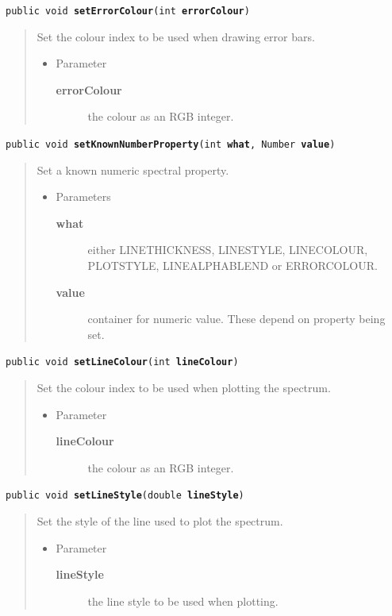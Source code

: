 \documentclass[twoside,11pt]{article}
\renewcommand{\_}{\texttt{\symbol{95}}}
\newcommand{\method}[1]{\texttt{#1}}
\newenvironment{desc}{\begin{quote}}{\end{quote}}
\begin{document}
\method{public void \textbf{setErrorColour}(\texttt{int} \textbf{errorColour})\label{l101}\label{l102}}
\begin{desc}Set the colour index to be used when drawing error bars.
\begin{itemize}
\item{Parameter
  \begin{description}
   \item[\textbf{errorColour}]{the colour as an RGB integer.}
  \end{description}}
\end{itemize}
\end{desc}

\method{public void \textbf{setKnownNumberProperty}(\texttt{int} \textbf{what}, \texttt{Number} \textbf{value})\label{l103}\label{l104}}
\begin{desc}Set a known numeric spectral property.
\begin{itemize}
\item{Parameters
  \begin{description}
   \item[\textbf{what}]{either LINE\_THICKNESS, LINE\_STYLE, LINE\_COLOUR,\\
             PLOT\_STYLE, LINE\_ALPHA\_BLEND or ERROR\_COLOUR.}
   \item[\textbf{value}]{container for numeric value. These depend on
              property being set.}
  \end{description}}
\end{itemize}
\end{desc}

\method{public void \textbf{setLineColour}(\texttt{int} \textbf{lineColour})\label{l105}\label{l106}}
\begin{desc}Set the colour index to be used when plotting the spectrum.
\begin{itemize}
\item{Parameter
  \begin{description}
   \item[\textbf{lineColour}]{the colour as an RGB integer.}
  \end{description}}
\end{itemize}
\end{desc}

\method{public void \textbf{setLineStyle}(\texttt{double} \textbf{lineStyle})\label{l107}\label{l108}}
\begin{desc}Set the style of the line used to plot the spectrum.
\begin{itemize}
\item{Parameter
  \begin{description}
   \item[\textbf{lineStyle}]{the line style to be used when plotting.}
  \end{description}}
\end{itemize}
\end{desc}
\end{document}
